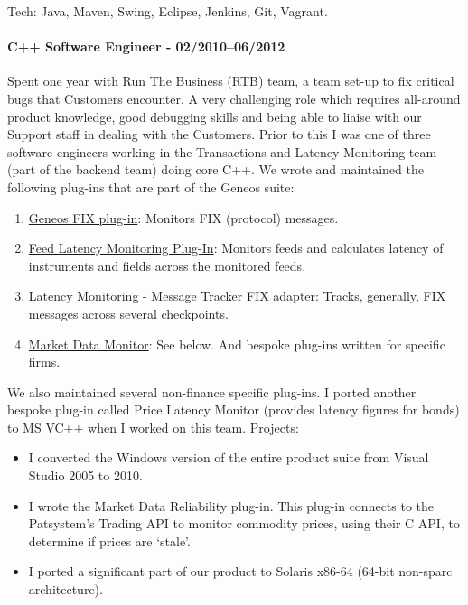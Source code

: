 \documentclass[
  a4paper,
]{article}
\providecommand{\tightlist}{%
  \setlength{\itemsep}{0pt}\setlength{\parskip}{0pt}}
\begin{document}
Tech: Java, Maven, Swing, Eclipse, Jenkins, Git, Vagrant.

\hypertarget{c-software-engineer---022010062012}{%
\paragraph{C++ Software Engineer -
02/2010--06/2012}\label{c-software-engineer---022010062012}}

Spent one year with Run The Business (RTB) team, a team set-up to fix
critical bugs that Customers encounter. A very challenging role which
requires all-around product knowledge, good debugging skills and being
able to liaise with our Support staff in dealing with the Customers.
Prior to this I was one of three software engineers working in the
Transactions and Latency Monitoring team (part of the backend team)
doing core C++. We wrote and maintained the following plug-ins that are
part of the Geneos suite:

\begin{enumerate}
\def\labelenumi{\arabic{enumi}.}
\tightlist
\item
  \href{https://docs.itrsgroup.com/docs/geneos/5.1.0/Netprobe/trading_fix/fix.html}{Geneos
  FIX plug-in}: Monitors FIX (protocol) messages.
\item
  \href{https://docs.itrsgroup.com/docs/geneos/5.2.0/Netprobe/market_data_monitoring/feedadapter_ug.html}{Feed
  Latency Monitoring Plug-In}: Monitors feeds and calculates latency of
  instruments and fields across the monitored feeds.
\item
  \href{https://docs.itrsgroup.com/docs/geneos/5.2.0/Netprobe/latency_monitoring/message_tracker/fix_adapter.html}{Latency
  Monitoring - Message Tracker FIX adapter}: Tracks, generally, FIX
  messages across several checkpoints.
\item
  \href{https://docs.itrsgroup.com/docs/geneos/5.2.0/Netprobe/market_data_monitoring/mdm_ug.html}{Market
  Data Monitor}: See below. And bespoke plug-ins written for specific
  firms.
\end{enumerate}

We also maintained several non-finance specific plug-ins. I ported
another bespoke plug-in called Price Latency Monitor (provides latency
figures for bonds) to MS VC++ when I worked on this team. Projects:

\begin{itemize}
\tightlist
\item
  I converted the Windows version of the entire product suite from
  Visual Studio 2005 to 2010.
\item
  I wrote the Market Data Reliability plug-in. This plug-in connects to
  the Patsystem's Trading API to monitor commodity prices, using their C
  API, to determine if prices are `stale'.
\item
  I ported a significant part of our product to Solaris x86-64 (64-bit
  non-sparc architecture).
\end{itemize}
\end{document}

